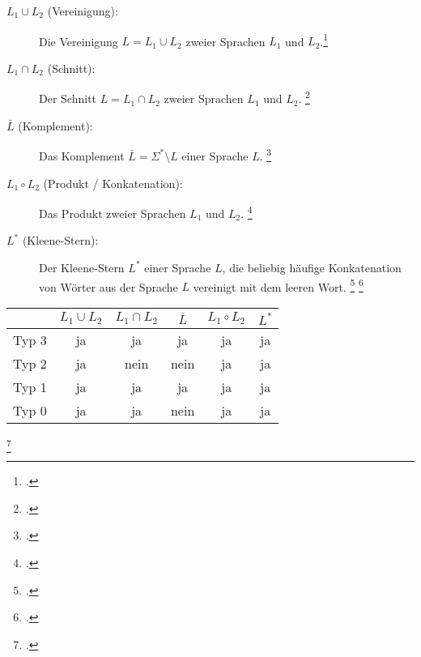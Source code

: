 \documentclass{lehramt-informatik-haupt}
\begin{document}
\begin{description}

%

\item[$L_1 \cup L_2$ (Vereinigung):]

Die Vereinigung $L = L_1 \cup L_2$ zweier Sprachen $L_1$ und
$L_2$.\footcite{wiki:menge}

%

\item[$L_1 \cap L_2$ (Schnitt):]

Der Schnitt $L = L_1 \cap L_2$ zweier Sprachen $L_1$ und $L_2$.
\footcite{wiki:menge}

%

\item[$\bar L$ (Komplement):]

Das Komplement $\bar L = \Sigma^* \setminus L$ einer Sprache
$L$.
\footcite{wiki:komplement}

%

\item[$L_1 \circ L_2$ (Produkt / Konkatenation):]

Das Produkt  zweier
Sprachen $L_1$ und $L_2$.
\footcite{wiki:formale-sprache}

%

\item[$L^*$ (Kleene-Stern):]

Der Kleene-Stern $L^*$ einer Sprache $L$, \dh die beliebig
häufige Konkatenation von Wörter aus der Sprache $L$ vereinigt mit dem
leeren Wort.
\footcite[Seite 68]{theo:fs:1}
\footcite{wiki:kleensche-huelle}
\end{description}

{
\footnotesize
\begin{tabular}{r|c|c|c|c|c}
&
$L_1 \cup L_2$ &
$L_1 \cap L_2$  &
$\bar L$ &
$L_1 \circ L_2$ &
$L^*$ \\\hline
Typ 3 & ja   & ja   & ja   & ja   & ja \\
Typ 2 & ja   & nein & nein & ja   & ja \\
Typ 1 & ja   & ja   & ja   & ja   & ja \\
Typ 0 & ja   & ja   & nein & ja   & ja \\
\end{tabular}
}
\footcite[Seite 33]{theo:fs:1}

%
\end{document}
